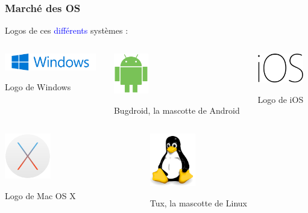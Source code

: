 \documentclass[aspectratio=169]{beamer}
\begin{document}
\begin{frame}
  \frametitle{Marché des OS}
  Logos de ces \textcolor{blue}{différents} systèmes : \\

\begin{columns}
    \begin{column}{0.3 \textwidth}
      \centering
        \includegraphics[width=4cm]{textures/images/intro/logo/windows.pdf}\par
      Logo de Windows
    \end{column}
    \begin{column}{0.3 \textwidth}
      \centering
      \includegraphics[width=1.5cm]{textures/images/intro/logo/android.pdf}\par
      Bugdroid, la mascotte de Android
    \end{column}
    \begin{column}{0.3 \textwidth}
      \centering
              \includegraphics[width=2cm]{textures/images/intro/logo/ios.pdf}\par
      Logo de iOS
    \end{column}
  \end{columns}
  \begin{columns}
    \begin{column}{0.3 \textwidth}
      \centering
        \includegraphics[width=2cm]{textures/images/intro/logo/osx.pdf}\par
      Logo de Mac OS X
    \end{column}
    \begin{column}{0.3 \textwidth}
      \centering
      \includegraphics[width=2cm]{textures/images/intro/logo/tux.pdf}\par
      Tux, la mascotte de Linux
    \end{column}
  \end{columns}
\end{frame}
\end{document}
